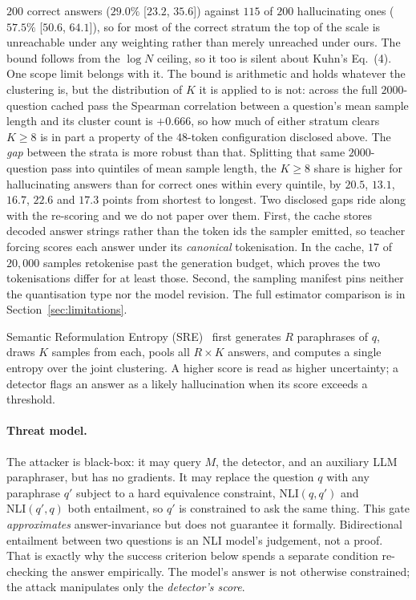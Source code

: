 $200$ correct answers ($29.0\%$ [$23.2$, $35.6$]) against $115$ of $200$ hallucinating ones
($57.5\%$ [$50.6$, $64.1$]), so for most of the correct stratum the top of the scale is
unreachable under any weighting rather than merely unreached under ours. The bound follows
from the $\log N$ ceiling, so it too is silent about Kuhn's Eq.~(4). One scope limit belongs
with it. The bound is arithmetic and holds whatever the clustering is, but the distribution
of $K$ it is applied to is not: across the full $2000$-question cached pass the Spearman
correlation between a question's mean sample length and its cluster count is $+0.666$, so how
much of either stratum clears $K \geq 8$ is in part a property of the $48$-token
configuration disclosed above. The \emph{gap} between the strata is more robust than that.
Splitting that same $2000$-question pass into quintiles of mean sample length, the
$K \geq 8$ share is higher for hallucinating answers than for correct ones within every
quintile, by $20.5$, $13.1$, $16.7$, $22.6$ and $17.3$ points from shortest to longest. Two
disclosed gaps ride
along with the re-scoring and we do not paper over them. First, the cache stores decoded
answer strings rather than the token ids the sampler emitted, so teacher forcing scores each
answer under its \emph{canonical} tokenisation. In the cache, $17$ of $20{,}000$ samples
retokenise past the generation budget, which proves the two tokenisations differ for at
least those.
Second, the sampling manifest pins neither the quantisation type nor the model revision. The
full estimator comparison is in Section~\ref{sec:limitations}.

Semantic Reformulation Entropy (SRE)~\citep{tong2025sre} first generates
$R$ paraphrases of $q$, draws $K$ samples from each, pools all $R{\times}K$
answers, and computes a single entropy over the joint clustering. A higher score
is read as higher uncertainty; a detector flags an answer as a likely
hallucination when its score exceeds a threshold.

\paragraph{Threat model.}
The attacker is black-box: it may query $M$, the detector, and an auxiliary LLM
paraphraser, but has no gradients. It may replace the question $q$ with any
paraphrase $q'$ subject to a hard equivalence constraint, $\mathrm{NLI}(q,q')$ and
$\mathrm{NLI}(q',q)$ both entailment, so $q'$ is constrained to ask the same
thing. This gate \emph{approximates} answer-invariance but does not guarantee it
formally. Bidirectional entailment between two questions is an NLI model's
judgement, not a proof. That is exactly why the success criterion below spends a
separate condition re-checking the answer empirically. The model's answer is not
otherwise constrained; the attack manipulates only the \emph{detector's score}.


